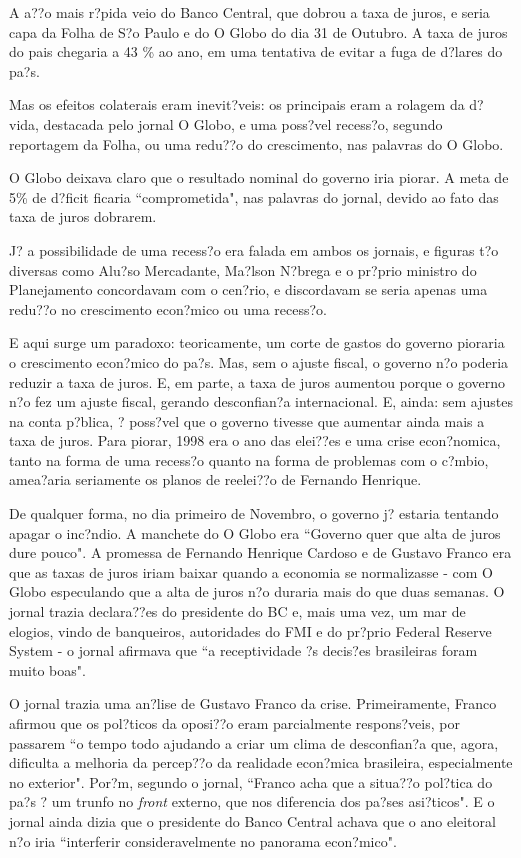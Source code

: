 \documentclass{article}
\begin{document}
A a??o mais r?pida veio do Banco Central, que dobrou a taxa de juros, e seria capa da Folha de S?o Paulo e do O Globo do dia 31 de Outubro. A taxa de juros do pais chegaria a 43 \% ao ano, em uma tentativa de evitar a fuga de d?lares do pa?s.  

Mas os efeitos colaterais eram inevit?veis: os principais eram a rolagem da d?vida, destacada pelo jornal O Globo, e uma poss?vel recess?o, segundo reportagem da Folha, ou uma redu??o do crescimento, nas palavras do O Globo. 

O Globo deixava claro que o resultado nominal do governo iria piorar. A meta de 5\% de d?ficit ficaria ``comprometida", nas palavras do jornal, devido ao fato das taxa de juros dobrarem.   
 
J? a possibilidade de uma recess?o era falada em ambos os jornais, e figuras t?o diversas como Alu?so Mercadante, Ma?lson N?brega e o pr?prio ministro do Planejamento concordavam com o cen?rio, e discordavam se seria apenas uma redu??o no crescimento econ?mico ou uma recess?o.

E aqui surge um paradoxo: teoricamente, um corte de gastos do governo pioraria o crescimento econ?mico do pa?s. Mas, sem o ajuste fiscal, o governo n?o poderia reduzir a taxa de juros. E, em parte, a taxa de juros aumentou porque o governo n?o fez um ajuste fiscal, gerando desconfian?a internacional. E, ainda: sem ajustes na conta p?blica, ? poss?vel que o governo tivesse que aumentar ainda mais a taxa de juros. Para piorar, 1998 era o ano das elei??es e uma crise econ?nomica, tanto na forma de uma recess?o quanto na forma de problemas com o c?mbio, amea?aria seriamente os planos de reelei??o de Fernando Henrique. 

De qualquer forma, no dia primeiro de Novembro, o governo j? estaria tentando apagar o inc?ndio. A manchete do O Globo era ``Governo quer que alta de juros dure pouco". A promessa de Fernando Henrique Cardoso e de Gustavo Franco era que as taxas de juros iriam baixar quando a economia se normalizasse - com O Globo especulando que a alta de juros n?o duraria mais do que duas semanas. O jornal trazia declara??es do presidente do BC e, mais uma vez, um mar de elogios, vindo de banqueiros, autoridades do FMI e do pr?prio Federal Reserve System - o jornal afirmava que ``a receptividade ?s decis?es brasileiras foram muito boas".

O jornal trazia uma an?lise de Gustavo Franco da crise. Primeiramente, Franco afirmou que os pol?ticos da oposi??o eram parcialmente respons?veis, por passarem ``o tempo todo ajudando a criar um clima de desconfian?a que, agora, dificulta a melhoria da percep??o da realidade econ?mica brasileira, especialmente no exterior". Por?m, segundo o jornal, ``Franco acha que a situa??o pol?tica do pa?s ? um trunfo no \textit{front} externo, que nos diferencia dos pa?ses asi?ticos". E o jornal ainda dizia que o presidente do Banco Central achava que o ano eleitoral n?o iria ``interferir consideravelmente no panorama econ?mico".  
\end{document}
